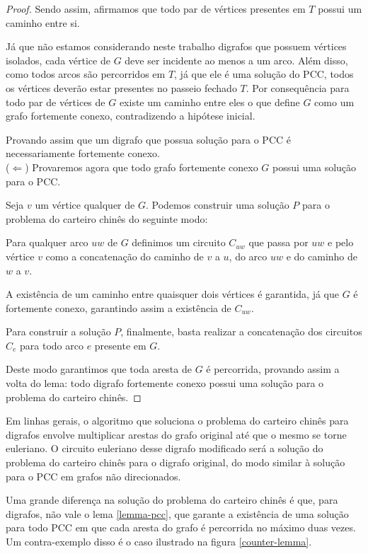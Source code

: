 \documentclass[12pt, a4paper]{article}
\begin{document}
\begin{proof}
        Sendo assim, afirmamos que todo par de vértices presentes em $T$ possui um caminho entre si.

        Já que não estamos considerando neste trabalho digrafos que possuem vértices isolados, cada vértice de $G$ deve ser incidente ao menos a um arco. Além disso, como todos arcos são percorridos em $T$, já que ele é uma solução do PCC, todos os vértices deverão estar presentes no passeio fechado $T$.
        Por consequência para todo par de vértices de $G$ existe um caminho entre eles o que define $G$ como um grafo fortemente conexo, contradizendo a hipótese inicial.

        Provando assim que um digrafo que possua solução para o PCC é necessariamente fortemente conexo. \\

        ($\Leftarrow$)  Provaremos agora que todo grafo fortemente conexo $G$ possui uma solução para o PCC.

        Seja $v$ um vértice qualquer de $G$. Podemos construir uma solução $P$ para o problema do carteiro chinês do seguinte modo:


        Para qualquer arco $uw$ de $G$ definimos um circuito $C_{uw}$ que passa por $uw$ e pelo vértice $v$ como a concatenação do caminho de $v$ a $u$, do arco $uw$ e do caminho de $w$ a $v$.
        
        A existência de um caminho entre quaisquer dois vértices é garantida, já que $G$ é fortemente conexo, garantindo assim a existência de $C_{uw}$.
        
        Para construir a solução $P$, finalmente, basta realizar a concatenação dos circuitos $C_{e}$ para todo arco $e$ presente em $G$.

        Deste modo garantimos que toda aresta de $G$ é percorrida, provando assim a volta do lema: todo digrafo fortemente conexo possui uma solução para o problema do carteiro chinês.

    \end{proof}

    Em linhas gerais, o algoritmo que soluciona o problema do carteiro chinês para digrafos envolve multiplicar arestas do grafo original até que o mesmo se torne euleriano. O circuito euleriano desse digrafo modificado será a solução do problema do carteiro chinês para o digrafo original, do modo similar à solução para o PCC em grafos não direcionados.
    
    Uma grande diferença na solução do problema do carteiro chinês é que, para digrafos, não vale o lema \ref{lemma-pcc}, que garante a existência de uma solução para todo PCC em que cada aresta do grafo é percorrida no máximo duas vezes.
    Um contra-exemplo disso é o caso ilustrado na figura \ref{counter-lemma}. 
\end{document}
